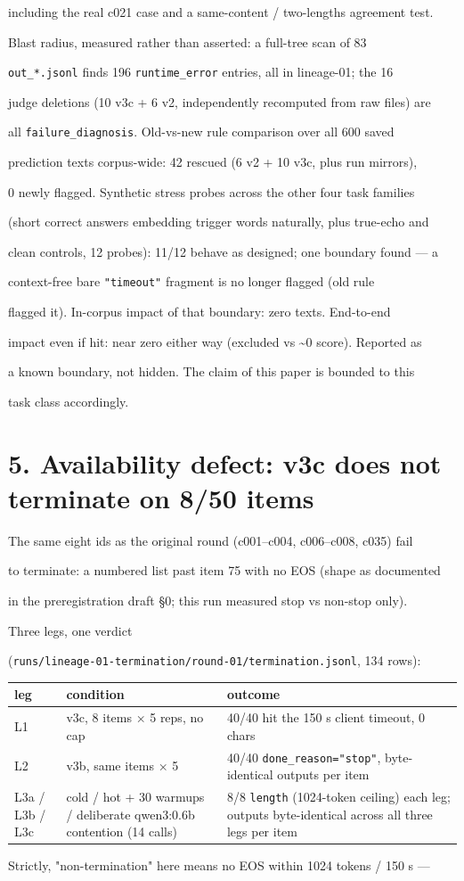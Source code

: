 \documentclass[11pt,a4paper]{article}
\begin{document}
including the real c021 case and a same-content / two-lengths agreement test.

Blast radius, measured rather than asserted: a full-tree scan of 83

\texttt{out\_*.jsonl} finds 196 \texttt{runtime\_error} entries, all in lineage-01; the 16

judge deletions (10 v3c + 6 v2, independently recomputed from raw files) are

all \texttt{failure\_diagnosis}. Old-vs-new rule comparison over all 600 saved

prediction texts corpus-wide: 42 rescued (6 v2 + 10 v3c, plus run mirrors),

0 newly flagged. Synthetic stress probes across the other four task families

(short correct answers embedding trigger words naturally, plus true-echo and

clean controls, 12 probes): 11/12 behave as designed; one boundary found — a

context-free bare \texttt{"timeout"} fragment is no longer flagged (old rule

flagged it). In-corpus impact of that boundary: zero texts. End-to-end

impact even if hit: near zero either way (excluded vs \textasciitilde{}0 score). Reported as

a known boundary, not hidden. The claim of this paper is bounded to this

task class accordingly.

\section*{5. Availability defect: v3c does not terminate on 8/50 items}
The same eight ids as the original round (c001–c004, c006–c008, c035) fail

to terminate: a numbered list past item 75 with no EOS (shape as documented

in the preregistration draft §0; this run measured stop vs non-stop only).

Three legs, one verdict

(\texttt{runs/lineage-01-termination/round-01/termination.jsonl}, 134 rows):

\begin{center}\small\begin{tabular}{p{5.2cm}|p{5.2cm}|p{5.2cm}}
\hline
leg & condition & outcome \\ \hline
L1 & v3c, 8 items × 5 reps, no cap & 40/40 hit the 150 s client timeout, 0 chars \\ \hline
L2 & v3b, same items × 5 & 40/40 \texttt{done\_reason="stop"}, byte-identical outputs per item \\ \hline
L3a / L3b / L3c & cold / hot + 30 warmups / deliberate qwen3:0.6b contention (14 calls) & 8/8 \texttt{length} (1024-token ceiling) each leg; outputs byte-identical across all three legs per item \\ \hline
\end{tabular}\end{center}
Strictly, "non-termination" here means no EOS within 1024 tokens / 150 s —
\end{document}

